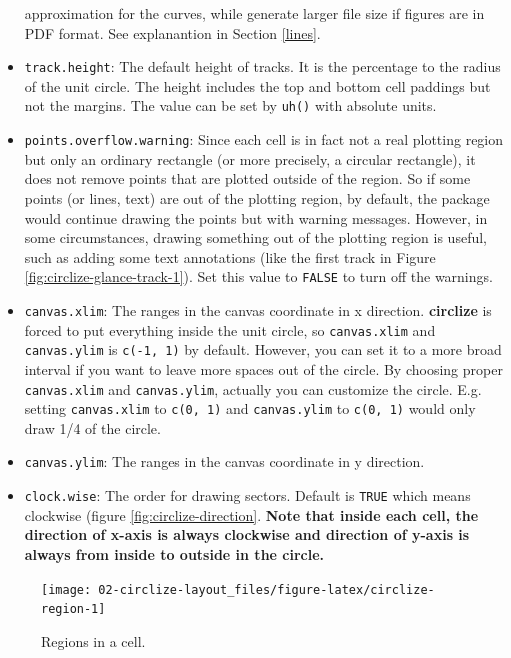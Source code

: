 \documentclass[]{book}
\theoremstyle{definition}
\theoremstyle{definition}
\theoremstyle{remark}
\begin{document}
\begin{itemize}
  approximation for the curves, while generate larger file size if
  figures are in PDF format. See explanantion in Section \ref{lines}.
\item
  \texttt{track.height}: The default height of tracks. It is the
  percentage to the radius of the unit circle. The height includes the
  top and bottom cell paddings but not the margins. The value can be set
  by \texttt{uh()} with absolute units.
\item
  \texttt{points.overflow.warning}: Since each cell is in fact not a
  real plotting region but only an ordinary rectangle (or more
  precisely, a circular rectangle), it does not remove points that are
  plotted outside of the region. So if some points (or lines, text) are
  out of the plotting region, by default, the package would continue
  drawing the points but with warning messages. However, in some
  circumstances, drawing something out of the plotting region is useful,
  such as adding some text annotations (like the first track in Figure
  \ref{fig:circlize-glance-track-1}). Set this value to \texttt{FALSE}
  to turn off the warnings.
\item
  \texttt{canvas.xlim}: The ranges in the canvas coordinate in x
  direction. \textbf{circlize} is forced to put everything inside the
  unit circle, so \texttt{canvas.xlim} and \texttt{canvas.ylim} is
  \texttt{c(-1,\ 1)} by default. However, you can set it to a more broad
  interval if you want to leave more spaces out of the circle. By
  choosing proper \texttt{canvas.xlim} and \texttt{canvas.ylim},
  actually you can customize the circle. E.g. setting
  \texttt{canvas.xlim} to \texttt{c(0,\ 1)} and \texttt{canvas.ylim} to
  \texttt{c(0,\ 1)} would only draw 1/4 of the circle.
\item
  \texttt{canvas.ylim}: The ranges in the canvas coordinate in y
  direction.
\item
  \texttt{clock.wise}: The order for drawing sectors. Default is
  \texttt{TRUE} which means clockwise (figure
  \ref{fig:circlize-direction}. \textbf{Note that inside each cell, the
  direction of x-axis is always clockwise and direction of y-axis is
  always from inside to outside in the circle.}
\end{itemize}

\begin{figure}

{\centering \texttt{[image: 02-circlize-layout\_files/figure-latex/circlize-region-1]} 

}

\caption{Regions in a cell.}\label{fig:circlize-region}
\end{figure}
\end{document}
